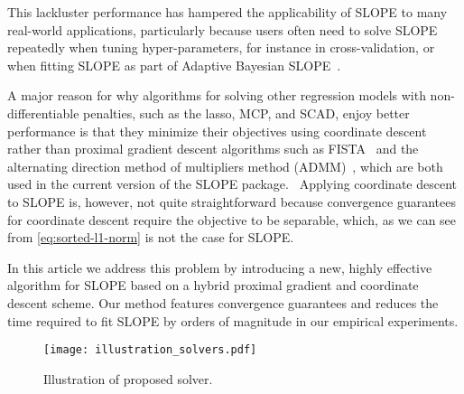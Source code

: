 This lackluster performance has hampered the applicability of SLOPE to many
real-world applications,  particularly because users often need to solve SLOPE
repeatedly when tuning hyper-parameters, for instance in
cross-validation, or when fitting SLOPE as part of Adaptive Bayesian
SLOPE~\cite{jiang2022}.

A major reason for why algorithms for solving other regression models with
non-differentiable penalties, such as the lasso, MCP, and SCAD, enjoy better
performance is that they minimize their objectives using coordinate
descent~\cite{breheny2011, friedman2010} rather than proximal gradient descent
algorithms such as FISTA~\cite{beck2009} and the
alternating direction method of multipliers method (ADMM)~\cite{boyd2010},
which are both used in the current version of the SLOPE package.
\
Applying coordinate descent to SLOPE is, however, not quite straightforward
because convergence guarantees for coordinate descent require the
objective to be separable, which, as we can see from \eqref{eq:sorted-l1-norm}
is not the case for SLOPE.


In this article we address this problem by introducing a new, highly effective
algorithm for SLOPE based on a hybrid proximal gradient and coordinate descent
scheme. Our method features convergence guarantees and reduces the time
required to fit SLOPE by orders of magnitude in our empirical experiments.

\begin{figure}[htbp]
  \centering
  \texttt{[image: illustration\_solvers.pdf]}
  \caption{Illustration of proposed solver.}
  \label{fig:illustration-solver}
\end{figure}
